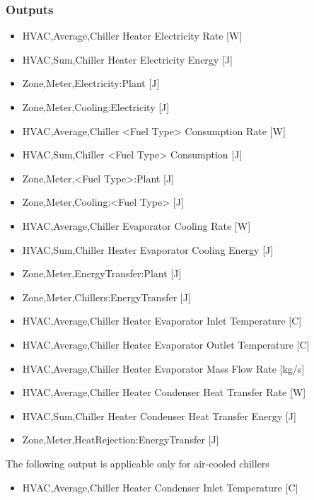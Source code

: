 \subsubsection{Outputs}\label{outputs-8-005}

\begin{itemize}
\item
  HVAC,Average,Chiller Heater Electricity Rate {[}W{]}
\item
  HVAC,Sum,Chiller Heater Electricity Energy {[}J{]}
\item
  Zone,Meter,Electricity:Plant {[}J{]}
\item
  Zone,Meter,Cooling:Electricity {[}J{]}
\item
  HVAC,Average,Chiller \textless{}Fuel Type\textgreater{} Consumption Rate {[}W{]}
\item
  HVAC,Sum,Chiller \textless{}Fuel Type\textgreater{} Consumption {[}J{]}
\item
  Zone,Meter,\textless{}Fuel Type\textgreater{}:Plant {[}J{]}
\item
  Zone,Meter,Cooling:\textless{}Fuel Type\textgreater{} {[}J{]}
\item
  HVAC,Average,Chiller Evaporator Cooling Rate {[}W{]}
\item
  HVAC,Sum,Chiller Heater Evaporator Cooling Energy {[}J{]}
\item
  Zone,Meter,EnergyTransfer:Plant {[}J{]}
\item
  Zone,Meter,Chillers:EnergyTransfer {[}J{]}
\item
  HVAC,Average,Chiller Heater Evaporator Inlet Temperature {[}C{]}
\item
  HVAC,Average,Chiller Heater Evaporator Outlet Temperature {[}C{]}
\item
  HVAC,Average,Chiller Heater Evaporator Mass Flow Rate {[}kg/s{]}
\item
  HVAC,Average,Chiller Heater Condenser Heat Transfer Rate {[}W{]}
\item
  HVAC,Sum,Chiller Heater Condenser Heat Transfer Energy {[}J{]}
\item
  Zone,Meter,HeatRejection:EnergyTransfer {[}J{]}
\end{itemize}

The following output is applicable only for air-cooled chillers

\begin{itemize}
\tightlist
\item
  HVAC,Average,Chiller Heater Condenser Inlet Temperature {[}C{]}
\end{itemize}

